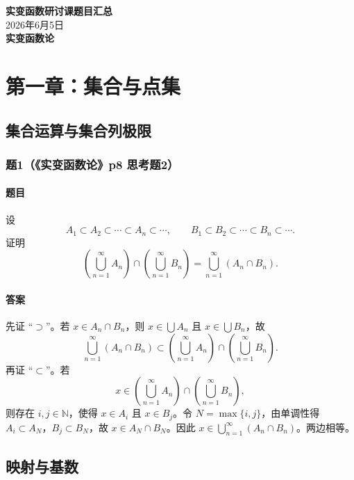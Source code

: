 \documentclass{article}
\newcommand{\N}{\mathbb{N}}
\begin{document}
	
	\begin{center}
		{\LARGE \textbf{实变函数研讨课题目汇总}}\\[0.3cm]
		{\large 2026年6月5日}\\[0.3cm]
		{\Large \textbf{实变函数论}}
	\end{center}

\section{第一章：集合与点集}

\subsection{集合运算与集合列极限}

\subsubsection*{题1（《实变函数论》p8 思考题2）}
\paragraph{题目}设
\[
A_1\subset A_2\subset\cdots\subset A_n\subset\cdots,\qquad
B_1\subset B_2\subset\cdots\subset B_n\subset\cdots .
\]
证明
\[
\left(\bigcup_{n=1}^{\infty}A_n\right)\cap
\left(\bigcup_{n=1}^{\infty}B_n\right)
=\bigcup_{n=1}^{\infty}(A_n\cap B_n).
\]

\paragraph{答案}先证 ``$\supset$''。若 $x\in A_n\cap B_n$，则 $x\in\bigcup A_n$ 且 $x\in\bigcup B_n$，故
\[
\bigcup_{n=1}^{\infty}(A_n\cap B_n)
\subset
\left(\bigcup_{n=1}^{\infty}A_n\right)\cap
\left(\bigcup_{n=1}^{\infty}B_n\right).
\]
再证 ``$\subset$''。若
\[
x\in \left(\bigcup_{n=1}^{\infty}A_n\right)\cap
\left(\bigcup_{n=1}^{\infty}B_n\right),
\]
则存在 $i,j\in\N$，使得 $x\in A_i$ 且 $x\in B_j$。令 $N=\max\{i,j\}$，由单调性得 $A_i\subset A_N$，$B_j\subset B_N$，故 $x\in A_N\cap B_N$。因此 $x\in\bigcup_{n=1}^{\infty}(A_n\cap B_n)$。两边相等。

\subsection{映射与基数}
\end{document}
